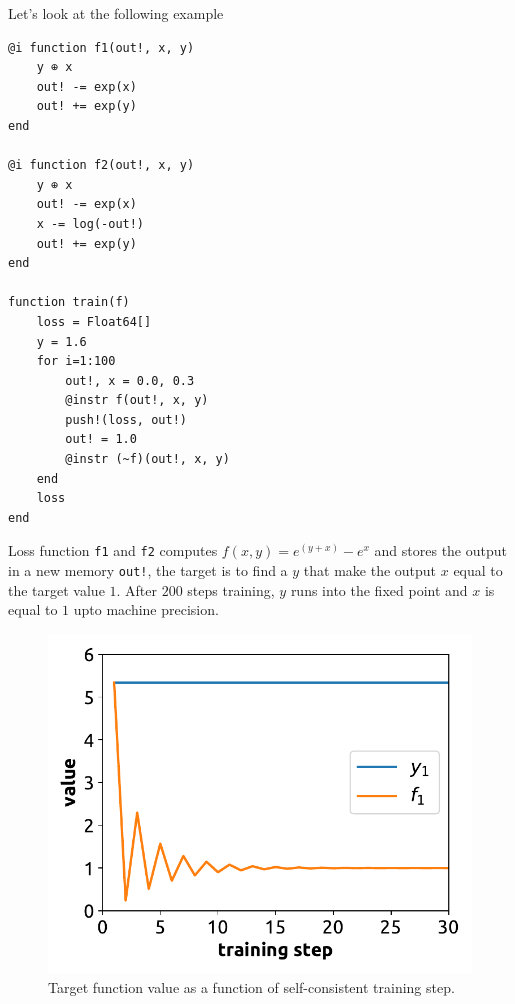 \documentclass{article}
\newcommand{\<}{\langle}
\renewcommand{\>}{\rangle}
\begin{document}
Let's look at the following example
\begin{minipage}{.44\textwidth}
\begin{lstlisting}[basicstyle=\small\ttfamily,columns=fullflexible]
@i function f1(out!, x, y)
    y ⊕ x
    out! -= exp(x)
    out! += exp(y)
end

@i function f2(out!, x, y)
    y ⊕ x
    out! -= exp(x)
    x -= log(-out!)
    out! += exp(y)
end

function train(f)
    loss = Float64[]
    y = 1.6
    for i=1:100
        out!, x = 0.0, 0.3
        @instr f(out!, x, y)
        push!(loss, out!)
        out! = 1.0
        @instr (~f)(out!, x, y)
    end
    loss
end
\end{lstlisting}
\end{minipage}

Loss function \texttt{f1} and \texttt{f2} computes $f(x, y) = e^{(y+x)} - e^x$ and stores the output in a new memory \texttt{out!}, the target is to find a $y$ that make the output $x$ equal to the target value $1$.
After $200$ steps training, $y$ runs into the fixed point and $x$ is equal to $1$ upto machine precision.

\begin{figure}
    \centerline{\includegraphics[width=\columnwidth,trim={0 0 0 0},clip]{images/fig1.pdf}}
    \caption{Target function value as a function of self-consistent training step.}\label{fig:invtrain}
\end{figure}
\end{document}
